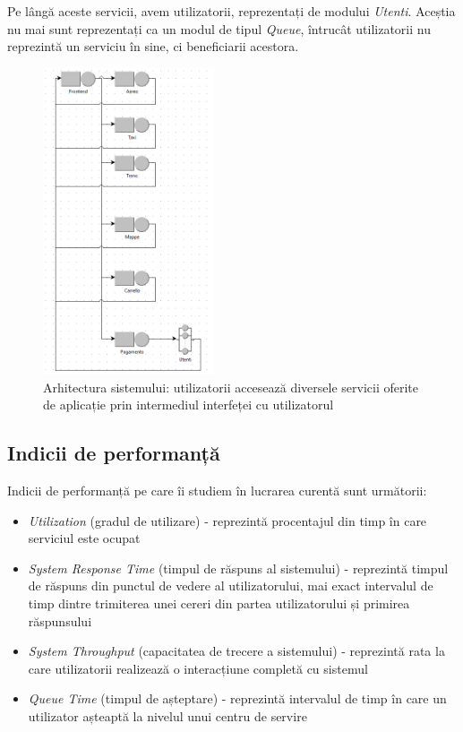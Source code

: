 \documentclass[12pt]{article}
\begin{document}
            Pe lângă aceste servicii, avem utilizatorii, reprezentați de modului \textit{Utenti}. Aceștia nu mai sunt reprezentați ca un modul de tipul \textit{Queue}, întrucât utilizatorii nu reprezintă un serviciu în sine, ci beneficiarii acestora.

            \begin{figure}[h!]
                \centering
                \includegraphics[width=0.45\textwidth]{images/architecture.png}
                \caption{Arhitectura sistemului: utilizatorii accesează diversele servicii oferite de aplicație prin intermediul interfeței cu utilizatorul}
            \end{figure}

        \subsection{Indicii de performanță}
            Indicii de performanță pe care îi studiem în lucrarea curentă sunt următorii:
            \begin{itemize}
                \item{\textit{Utilization} (gradul de utilizare) - reprezintă procentajul din timp în care serviciul este ocupat}
                \item{\textit{System Response Time} (timpul de răspuns al sistemului) - reprezintă timpul de răspuns din punctul de vedere al utilizatorului, mai exact intervalul de timp dintre trimiterea unei cereri din partea utilizatorului și primirea răspunsului}
                \item{\textit{System Throughput} (capacitatea de trecere a sistemului) - reprezintă rata la care utilizatorii realizează o interacțiune completă cu sistemul}
                \item{\textit{Queue Time} (timpul de așteptare) - reprezintă intervalul de timp în care un utilizator așteaptă la nivelul unui centru de servire}
            \end{itemize}
\end{document}
